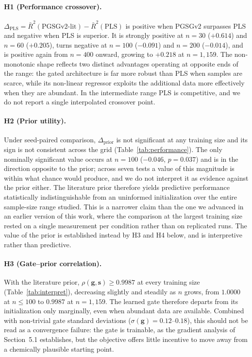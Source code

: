 \documentclass[preprint,12pt,hidelinks]{elsarticle}
\begin{document}
\paragraph{H1 (Performance crossover).}
$\Delta_\mathrm{PLS} = \bar{R}^2(\text{PGSGv2-lit}) - \bar{R}^2(\text{PLS})$ is
positive when PGSGv2 surpasses PLS and negative when PLS is superior. It is
strongly positive at $n = 30$ ($+0.614$) and $n = 60$ ($+0.205$), turns
negative at $n = 100$ ($-0.091$) and $n = 200$ ($-0.014$), and is positive
again from $n = 400$ onward, growing to $+0.218$ at $n = 1{,}159$. The
non-monotonic shape reflects two distinct advantages operating at opposite
ends of the range: the gated architecture is far more robust than PLS when
samples are scarce, while its non-linear regressor exploits the additional
data more effectively when they are abundant. In the intermediate range PLS
is competitive, and we do not report a single interpolated crossover point.

\paragraph{H2 (Prior utility).}
Under seed-paired comparison, $\Delta_\mathrm{prior}$ is not significant at
any training size and its sign is not consistent across the grid
(Table~\ref{tab:performance}). The only nominally significant value occurs at
$n = 100$ ($-0.046$, $p = 0.037$) and is in the direction opposite to the
prior; across seven tests a value of this magnitude is within what chance
would produce, and we do not interpret it as evidence against the prior
either. The literature prior therefore yields predictive performance
statistically indistinguishable from an uninformed initialization over the
entire sample-size range studied. This is a narrower claim than the one we
advanced in an earlier version of this work, where the comparison at the
largest training size rested on a single measurement per condition rather
than on replicated runs. The value of the prior is established instead by
H3 and H4 below, and is interpretive rather than predictive.

\paragraph{H3 (Gate--prior correlation).}
With the literature prior, $\rho(\mathbf{g},\mathbf{s}) \geq 0.9987$ at every
training size (Table~\ref{tab:interpret}), decreasing slightly and steadily
as $n$ grows, from $1.0000$ at $n \leq 100$ to $0.9987$ at $n = 1{,}159$. The
learned gate therefore departs from its initialization only marginally, even
when abundant data are available. Combined with non-trivial gate standard
deviations ($\sigma(\mathbf{g}) = 0.12$--$0.18$), this should not be read as a
convergence failure: the gate is trainable, as the gradient analysis of
Section~5.1 establishes, but the objective offers little incentive to move
away from a chemically plausible starting point.
\end{document}
